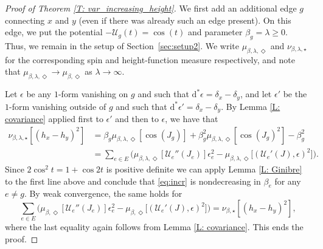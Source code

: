 \documentclass[11pt, reqno]{amsart}
\numberwithin{equation}{section}
\theoremstyle{definition}
\theoremstyle{remark}
\renewcommand{\d}{\mathrm{d}}
\renewcommand{\c}[1]{\ensuremath{\mathcal{#1}}}
\newcommand{\J}{J}
\newcommand{\exact}{\star}
\newcommand{\coclosed}{\Diamond}
\begin{document}
\begin{proof}[Proof of Theorem \ref{T: var_increasing_height}]
We first add an additional edge $g$ connecting $x$ and $y$ (even if there was already such an edge present).
On this edge, we put the potential $-\c{U}_{g}(t) = \cos(t)$ and parameter $\beta_{g} =\lambda \geq 0$. 
Thus, we remain in the setup of Section~\ref{sec:setup2}. We write $\mu_{\beta,\lambda,\coclosed}$ and $\nu_{\beta,\lambda,\exact}$ for the corresponding spin and height-function measure respectively, and note that $\mu_{\beta,\lambda,\coclosed}\to \mu_{\beta,\coclosed}$ as $\lambda\to \infty$. 

Let $\epsilon$ be any $1$-form vanishing on $g$ and such that $\d^*\epsilon=\delta_x-\delta_y$, and let $\epsilon'$ be the $1$-form vanishing outside of $g$ and such that $\d^*\epsilon'=\delta_x-\delta_y$.
By Lemma \ref{L: covariance} applied first to $\epsilon'$ and then to $\epsilon$, we have that 
\begin{align}\label{eq:incr}
	\mathbb \nu_{\beta,\lambda, \exact}[(h_x-h_{y})^2] &=  \beta_g\mu_{\beta,\lambda, \coclosed}[\cos(\J_g)] +\beta_g^2\mu_{\beta, \lambda,\coclosed}[\cos(\J_g)^2]-\beta_g^2 \nonumber \\
	&= \sum_{e \in E}\big( \mu_{\beta,\lambda, \coclosed}[\c{U}_e''(\J_e)] \epsilon^2_e -  \mu_{\beta,\lambda, \coclosed} \big[(\c{U}_e'(\J), \epsilon)^2\big]\big) .
\end{align}
Since $2\cos^2 t=1+\cos2t$ is positive definite we can apply Lemma \ref{L: Ginibre} to the first line above and conclude that \eqref{eq:incr} is nondecreasing in $\beta_e$ for any $e\neq g$.
By weak convergence, the same holds for 
 \[
\sum_{e \in E}\big( \mu_{\beta, \coclosed}[\c{U}_e''(\J_e)] \epsilon^2_e -  \mu_{\beta, \coclosed} \big[(\c{U}_e'(\J), \epsilon)^2\big]\big) = \mathbb \nu_{\beta, \exact}[(h_x-h_{y})^2],
 \]
where the last equality again follows from Lemma \ref{L: covariance}. This ends the proof. 
\end{proof}



\end{document}
